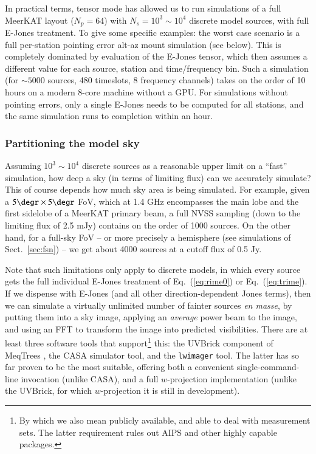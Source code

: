 \documentclass{aa}
\begin{document}
In practical terms, tensor mode has allowed us to run simulations of a full MeerKAT layout ($N_p=64$) 
with $N_s=10^3\sim10^4$ discrete model sources, with full E-Jones treatment. To give some specific examples: the worst case scenario is a full per-station pointing error alt-az mount simulation (see below). This is completely dominated by evaluation of the E-Jones tensor, which then assumes a different value for each source, station and time/frequency bin. Such a simulation (for $\sim5000$ sources, 480 timeslots, 8 frequency channels) takes on the order of 10 hours on a modern 8-core machine without a GPU. For simulations without pointing errors, only a single E-Jones needs to be computed for all stations, and the same simulation runs to completion within an hour.


\subsubsection{Partitioning the model sky}

Assuming $10^3\sim10^4$ discrete sources as a reasonable upper limit on a ``fast'' simulation, how deep a sky (in terms of limiting flux) can we accurately simulate? This of course depends how much sky area is being simulated. For example, given a $5\degr\times5\degr$ FoV, which at 1.4 GHz encompasses the main lobe and the first sidelobe of a MeerKAT primary beam, a full NVSS sampling (down to the limiting flux of 2.5 mJy) contains on the order of 1000 sources. On the other hand, for a full-sky FoV -- or more precisely a hemisphere (see simulations of Sect.~\ref{sec:fsn}) -- we get about 4000 sources at a cutoff flux of 0.5 Jy. 

Note that such limitations only apply to discrete models, in which every source gets the full individual E-Jones treatment of Eq.~(\ref{eq:rime0}) or Eq.~(\ref{eq:trime}). If we dispense with E-Jones (and all other direction-dependent Jones terms), then we can simulate a virtually unlimited number of fainter sources \emph{en masse}, by putting them into a sky image, applying an \emph{average} power beam to the image, and using an FFT to transform the image into predicted visibilities. There are at least three software tools that support\footnote{By which we also mean publicly available, and able to deal with measurement sets. The latter requirement rules out AIPS and other highly capable packages.}  this: the UVBrick component of MeqTrees \citep{Abdalla:uvbrick}, the CASA simulator tool, and the {\tt lwimager} tool. The latter has so far proven to be the most suitable, offering both a convenient single-command-line invocation (unlike CASA), and a full $w$-projection \citep{Cornwell:wproj} implementation (unlike the UVBrick, for which $w$-projection it is still in development). 
\end{document}
